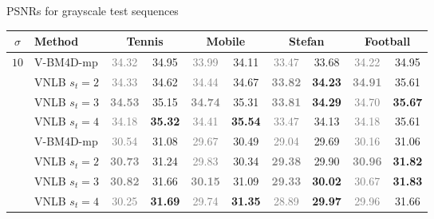 \documentclass[mathserif, 8pt]{beamer}
\newcommand{\bsic}[1]{\textcolor{gray}{#1}}
\newcommand{\Bsic}[1]{\textcolor{gray}{\textbf{#1}}}
\newcommand{\Best}[1]{\textbf{\textcolor{MyOrangeBrighter}{#1}}}
\begin{document}
\begin{frame}{PSNRs for grayscale test sequences}
	\begin{center}
		{\small
		\renewcommand{\tabcolsep}{2mm}
		\renewcommand{\arraystretch}{1.0}
		\begin{tabular}{ c | l |c c | c c | c c | c c}
			\hline
			\rule{0pt}{6pt}$\sigma$ & Method             & \multicolumn{2}{c}{Tennis}  & \multicolumn{2}{c}{Mobile}  &\multicolumn{2}{c}{Stefan}   & \multicolumn{2}{c}{Football} \\\hline
			\multirow{5}{*}{$10$} & V-BM4D-mp            & \bsic{34.32} &       34.95  & \bsic{33.99} &       34.11  & \bsic{33.47} &       33.68  & \bsic{34.22} &       34.95  \\
			                      & VNLB   $s_t = 2$     & \bsic{34.33} &       34.62  & \bsic{34.44} &       34.67  & \Bsic{33.82} & \Best{34.23} & \Bsic{34.91} &       35.61  \\
										 & VNLB   $s_t = 3$     & \Bsic{34.53} &       35.15  & \Bsic{34.74} &       35.31  & \Bsic{33.81} & \Best{34.29} & \bsic{34.70} & \Best{35.67} \\
			                      & VNLB   $s_t = 4$     & \bsic{34.18} & \Best{35.32} & \bsic{34.41} & \Best{35.54} & \bsic{33.47} &       34.13  & \bsic{34.18} &       35.61  \\\hline
%
			\multirow{5}{*}{$20$} & V-BM4D-mp            & \bsic{30.54} &       31.08  & \bsic{29.67} &       30.49  & \bsic{29.04} &       29.69  & \bsic{30.16} &       31.06  \\
			                      & VNLB   $s_t = 2$     & \Bsic{30.73} &       31.24  & \bsic{29.83} &       30.34  & \Bsic{29.38} &       29.90  & \Bsic{30.96} & \Best{31.82} \\
										 & VNLB   $s_t = 3$     & \Bsic{30.82} &       31.66  & \Bsic{30.15} &       31.09  & \Bsic{29.33} & \Best{30.02} & \bsic{30.67} & \Best{31.83} \\
			                      & VNLB   $s_t = 4$     & \bsic{30.25} & \Best{31.69} & \bsic{29.74} & \Best{31.35} & \bsic{28.89} & \Best{29.97} & \bsic{29.96} &       31.66  \\\hline

\end{tabular}}
\end{center}
\end{frame}
\end{document}
